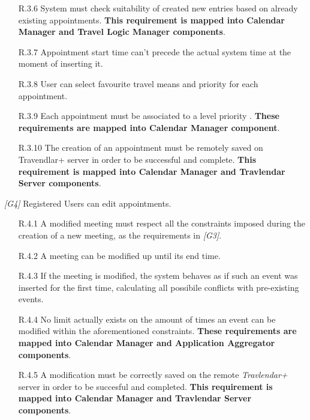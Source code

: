 \begin{description}
\begin{itemize}
			\item [R.3.6] System must check suitability of created new entries based on already existing appointments.
			\textbf{This requirement is mapped into Calendar Manager and Travel Logic Manager components}.

			\item [R.3.7] Appointment start time can't precede the actual system time at the moment of inserting it.

			\item [R.3.8] User can select favourite travel means and priority for each appointment.

			\item [R.3.9] Each appointment must be associated to a level priority	.
			\textbf{These requirements are mapped into Calendar Manager component}.

			\item [R.3.10] The creation of an appointment must be remotely saved on Travendlar+ server in order to be successful and complete.
			\textbf{This requirement is mapped into Calendar Manager and Travlendar Server components}.
		\end{itemize}


	\item \textit{[G4]} Registered Users can edit appointments.
		 \begin{itemize}
			\item  [R.4.1] A modified meeting must respect all the constraints imposed during the creation of a new meeting, as the requirements in \textit{[G3]}.

		 	\item [R.4.2] A meeting can be modified up until its end time.

		 	\item [R.4.3] If the meeting is modified, the system behaves as if such an event was inserted for the first time, calculating all possibile conflicts with pre-existing events.

		 	\item [R.4.4] No limit actually exists on the amount of times an event can be modified within the aforementioned constraints.
		 	\textbf{These requirements are mapped into Calendar Manager and Application Aggregator components}.

		 	\item [R.4.5] A modification must be correctly saved on the remote \textit{Travlendar+} server in order to be succesful and completed.
			\textbf{This requirement is mapped into Calendar Manager and Travlendar Server components}.
			

\end{itemize}
\end{description}
